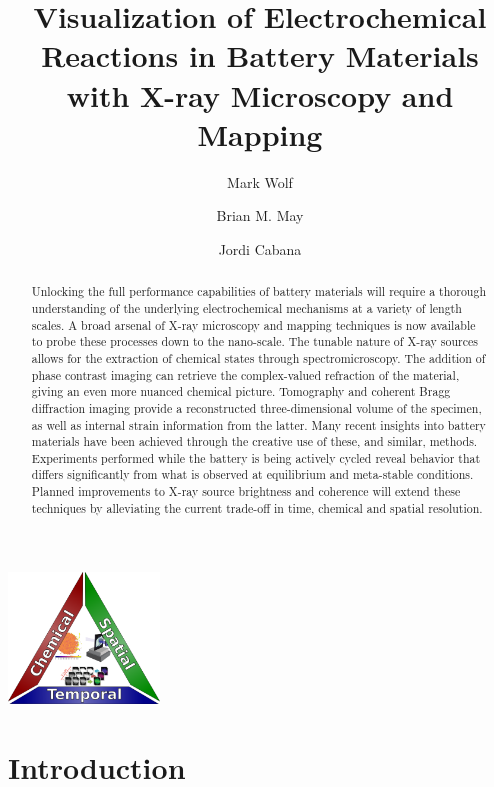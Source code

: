\documentclass[journal=cmatex,manuscript=perspective]{achemso}
\author{Mark Wolf}
\author{Brian M. May} %
\author{Jordi Cabana}
\affiliation[University of Illinois at Chicago]
{Department of Chemistry, University of Illinois at Chicago, Chicago IL}
\title{Visualization of Electrochemical Reactions in Battery Materials
  with X-ray Microscopy and Mapping}
\begin{document}
\begin{tocentry}
  \includegraphics[height=1.375in]{resolution-triangle.png}
\end{tocentry}

\begin{abstract}
  Unlocking the full performance capabilities of battery materials
  will require a thorough understanding of the underlying
  electrochemical mechanisms at a variety of length scales. A broad
  arsenal of X-ray microscopy and mapping techniques is now available
  to probe these processes down to the nano-scale. The tunable nature
  of X-ray sources allows for the extraction of chemical states
  through spectromicroscopy. The addition of phase contrast imaging
  can retrieve the complex-valued refraction of the material, giving
  an even more nuanced chemical picture. Tomography and coherent Bragg
  diffraction imaging provide a reconstructed three-dimensional volume
  of the specimen, as well as internal strain information from the
  latter. Many recent insights into battery materials have been
  achieved through the creative use of these, and similar,
  methods. Experiments performed while the battery is being actively
  cycled reveal behavior that differs significantly from what is
  observed at equilibrium and meta-stable conditions. Planned
  improvements to X-ray source brightness and coherence will extend
  these techniques by alleviating the current trade-off in time,
  chemical and spatial resolution.
\end{abstract}

\section{Introduction}
\end{document}

